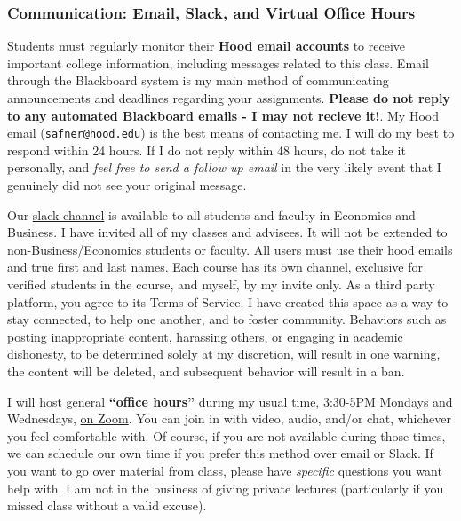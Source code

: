 \documentclass{article}
\begin{document}
\hypertarget{communication-email-slack-and-virtual-office-hours}{%
\subsubsection*{Communication: Email, Slack, and Virtual Office
Hours}\label{communication-email-slack-and-virtual-office-hours}}

Students must regularly monitor their \textbf{Hood email accounts} to
receive important college information, including messages related to
this class. Email through the Blackboard system is my main method of
communicating announcements and deadlines regarding your assignments.
\textbf{Please do not reply to any automated Blackboard emails - I may
not recieve it!}. My Hood email (\texttt{safner@hood.edu}) is the best
means of contacting me. I will do my best to respond within 24 hours. If
I do not reply within 48 hours, do not take it personally, and
\emph{feel free to send a follow up email} in the very likely event that
I genuinely did not see your original message.

Our \href{https://hoodcollegeeconomics.slack.com}{slack channel} is
available to all students and faculty in Economics and Business. I have
invited all of my classes and advisees. It will not be extended to
non-Business/Economics students or faculty. All users must use their
hood emails and true first and last names. Each course has its own
channel, exclusive for verified students in the course, and myself, by
my invite only. As a third party platform, you agree to its Terms of
Service. I have created this space as a way to stay connected, to help
one another, and to foster community. Behaviors such as posting
inappropriate content, harassing others, or engaging in academic
dishonesty, to be determined solely at my discretion, will result in one
warning, the content will be deleted, and subsequent behavior will
result in a ban.

I will host general \textbf{``office hours''} during my usual time,
3:30-5PM Mondays and Wednesdays, \href{https://zoom.us/j/458617463}{on
Zoom}. You can join in with video, audio, and/or chat, whichever you
feel comfortable with. Of course, if you are not available during those
times, we can schedule our own time if you prefer this method over email
or Slack. If you want to go over material from class, please have
\emph{specific} questions you want help with. I am not in the business
of giving private lectures (particularly if you missed class without a
valid excuse).
\end{document}
